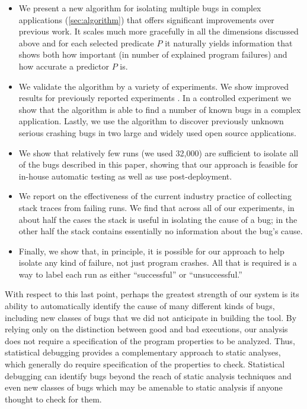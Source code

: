 \documentclass[draft]{sig-alternate}
\begin{document}
\begin{itemize}

\item We present a new algorithm for isolating multiple bugs in
complex applications (\autoref{sec:algorithm}) 
that offers significant improvements over previous work.
It scales much more gracefully in all the dimensions discussed above
and for each selected predicate $P$ it naturally yields information
that shows both how important (in number of explained program
failures) and how accurate a predictor $P$ is.

\item We validate the algorithm by a variety of experiments.  We show
improved results for previously reported experiments
\cite{PLDI`03*141}.  In a
controlled experiment we show that the algorithm is able to find a
number of known bugs in a complex application.  Lastly, we use
the algorithm to discover previously unknown serious crashing bugs in
two large and widely used open source applications.

\item We show that relatively few runs (we used 32,000) are sufficient
to isolate all of the bugs described in this paper, showing that our
approach is feasible for in-house automatic testing as well as use
post-deployment.

\item We report on the effectiveness of the current industry practice
of collecting stack traces from failing runs.  We find that across all
of our experiments, in about half the cases the stack is useful in
isolating the cause of a bug; in the other half the stack contains
essentially no information about the bug's cause.

\item Finally, we show that, in principle, it is possible for our
approach to help isolate any kind of failure, not just program
crashes.  All that is required is a way to label each run as either
``successful'' or ``unsuccessful.''

\end{itemize}

With respect to this last point, perhaps the greatest strength of our
system is its ability to automatically identify the cause of many
different kinds of bugs, including new classes of bugs that we did not
anticipate in building the tool.  By relying only on the distinction
between good and bad executions, our analysis does not require a
specification of the program properties to be analyzed.  Thus,
statistical debugging provides a complementary approach to static
analyses, which generally do require specification of the properties
to check.  Statistical debugging can identify bugs beyond the reach of
static analysis techniques and even new classes of bugs which may be
amenable to static analysis if anyone thought to check for them.
\end{document}
